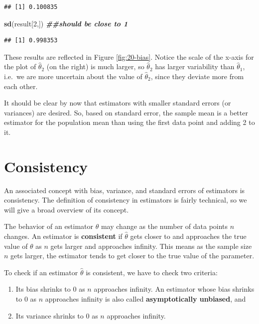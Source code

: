 \documentclass[
]{book}
\newenvironment{Shaded}{\begin{snugshade}}{\end{snugshade}}
\newcommand{\DecValTok}[1]{\textcolor[rgb]{0.00,0.00,0.81}{#1}}
\newcommand{\DocumentationTok}[1]{\textcolor[rgb]{0.56,0.35,0.01}{\textbf{\textit{#1}}}}
\newcommand{\FunctionTok}[1]{\textcolor[rgb]{0.13,0.29,0.53}{\textbf{#1}}}
\newcommand{\NormalTok}[1]{#1}
\providecommand{\tightlist}{%
  \setlength{\itemsep}{0pt}\setlength{\parskip}{0pt}}
\theoremstyle{definition}
\theoremstyle{definition}
\theoremstyle{definition}
\theoremstyle{definition}
\theoremstyle{remark}
\begin{document}
\begin{verbatim}
## [1] 0.100835
\end{verbatim}

\begin{Shaded}
\begin{Highlighting}[]
\FunctionTok{sd}\NormalTok{(result[}\DecValTok{2}\NormalTok{,]) }\DocumentationTok{\#\#should be close to 1}
\end{Highlighting}
\end{Shaded}

\begin{verbatim}
## [1] 0.998353
\end{verbatim}

These results are reflected in Figure \ref{fig:20-bias}. Notice the scale of the x-axis for the plot of \(\hat{\theta}_2\) (on the right) is much larger, so \(\hat{\theta}_2\) has larger variability than \(\hat{\theta}_1\), i.e.~we are more uncertain about the value of \(\hat{\theta}_2\), since they deviate more from each other.

It should be clear by now that estimators with smaller standard errors (or variances) are desired. So, based on standard error, the sample mean is a better estimator for the population mean than using the first data point and adding 2 to it.

\hypertarget{consistency}{%
\section{Consistency}\label{consistency}}

An associated concept with bias, variance, and standard errors of estimators is consistency. The definition of consistency in estimators is fairly technical, so we will give a broad overview of its concept.

The behavior of an estimator \(\hat{\theta}\) may change as the number of data points \(n\) changes. An estimator is \textbf{consistent} if \(\hat{\theta}\) gets closer to and approaches the true value of \(\theta\) as \(n\) gets larger and approaches infinity. This means as the sample size \(n\) gets larger, the estimator tends to get closer to the true value of the parameter.

To check if an estimator \(\hat{\theta}\) is consistent, we have to check two criteria:

\begin{enumerate}
\def\labelenumi{\arabic{enumi}.}
\tightlist
\item
  Its bias shrinks to 0 as \(n\) approaches infinity. An estimator whose bias shrinks to 0 as \(n\) approaches infinity is also called \textbf{asymptotically unbiased}, and
\item
  Its variance shrinks to 0 as \(n\) approaches infinity.
\end{enumerate}
\end{document}
